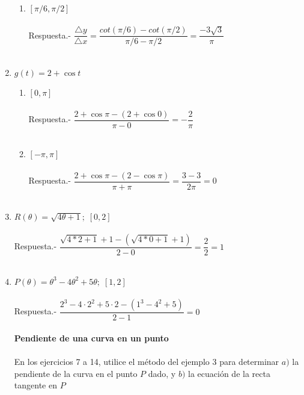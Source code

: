 \begin{enumerate}
\begin{enumerate}[\bfseries (a)]
    \item $[\pi/6,\pi/2]$\\\\
	Respuesta.-\; $\dfrac{\triangle y}{\triangle x} = \dfrac{cot(\pi/6)-cot(\pi/2)}{\pi/6-\pi/2} = \dfrac{-3\sqrt{3}}{\pi}$\\\\

\end{enumerate}

\item $g(t) = 2 + \cos t$ 
\begin{enumerate}[\bfseries (a)]

    \item $[0,\pi]$\\\\
	Respuesta.-\; $\dfrac{2+\cos \pi - (2+\cos 0)}{\pi - 0} = -\dfrac{2}{\pi}$\\\\

    \item $[-\pi,\pi]$\\\\
	Respuesta.-\; $\dfrac{2 + \cos \pi - (2 - \cos \pi)}{\pi+\pi} = \dfrac{3-3}{2\pi} = 0$\\\\

\end{enumerate}

\item $R(\theta) = \sqrt{4\theta + 1}; \; [0,2]$\\\\ 
    Respuesta.-\; $\dfrac{\sqrt{4*2+1}+1 - (\sqrt{4*0+1}+1)}{2-0} = \dfrac{2}{2} = 1$\\\\

\item $P(\theta) = \theta^3 - 4\theta^2 + 5\theta; \; [1,2]$\\\\
    Respuesta.-\; $\dfrac{2^3 - 4\cdot 2^2 + 5\cdot 2 - (1^3 - 4^2 + 5)}{2-1} = 0$\\\\

\textbf{Pendiente de una curva en un punto}\\\\
En los ejercicios 7 a 14, utilice el método del ejemplo 3 para determinar $a)$ la pendiente de la curva en el punto $P$ dado, y $b)$ la ecuación de la recta tangente en $P$\\\\


\end{enumerate}
